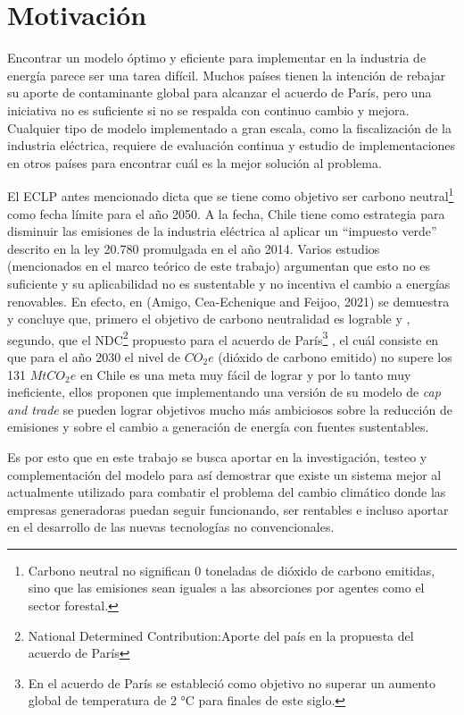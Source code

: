\section{Motivación}
Encontrar un modelo óptimo y eficiente para implementar en la industria de energía parece ser una tarea difícil. Muchos países tienen la intención de rebajar su aporte de contaminante global para alcanzar el acuerdo de París, pero una iniciativa no es suficiente si no se respalda con continuo cambio y mejora. Cualquier tipo de modelo implementado a gran escala, como la fiscalización de la industria eléctrica, requiere de evaluación continua y estudio de implementaciones en otros países para encontrar cuál es la mejor solución al problema.
\vspace{2.5mm}

El ECLP antes mencionado dicta que se tiene como objetivo ser carbono neutral\footnote{Carbono neutral no significan 0 toneladas de dióxido de carbono emitidas, sino que las emisiones sean iguales a las absorciones por agentes como el sector forestal.} como fecha límite para el año 2050. A la fecha, Chile tiene como estrategia para disminuir las emisiones de la industria eléctrica al aplicar un “impuesto verde” descrito en la ley 20.780 promulgada en el año 2014. Varios estudios (mencionados en el marco teórico de este trabajo) argumentan que esto no es suficiente y su aplicabilidad no es sustentable y no incentiva el cambio a energías renovables. En efecto, en (Amigo, Cea-Echenique and Feijoo, 2021) se demuestra y concluye que, primero el objetivo de carbono neutralidad es lograble y , segundo, que el NDC\footnote{National Determined Contribution:Aporte del país en la propuesta del acuerdo de París}  propuesto para el acuerdo de París\footnote{En el acuerdo de París se estableció como objetivo no superar un aumento global de temperatura de 2 °C para finales de este siglo.}  , el cuál consiste en que para el año 2030 el nivel de $CO_2 e$ (dióxido de carbono emitido) no supere los 131 $MtCO_2 e$ en Chile es una meta muy fácil de lograr y por lo tanto muy ineficiente, ellos proponen que implementando una versión de su modelo de \textit{cap and trade}  se pueden lograr objetivos mucho más ambiciosos sobre la reducción de emisiones y sobre el cambio a generación de energía con fuentes sustentables.
\vspace{2.5mm}

Es por esto que en este trabajo se busca aportar en la investigación, testeo y complementación del modelo para así demostrar que existe un sistema mejor al actualmente utilizado para combatir el problema del cambio climático donde las empresas generadoras puedan seguir funcionando, ser rentables e incluso aportar en el desarrollo de las nuevas tecnologías no convencionales.

